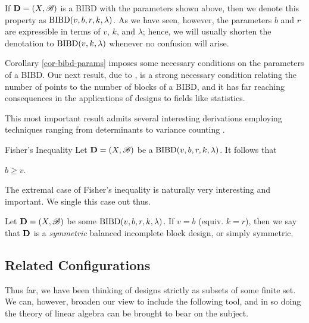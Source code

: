 \documentclass[../../../main]{subfiles}
\begin{document}
 If $\mathbf{D}=(X,\mathscr{B})$ is a BIBD with the parameters shown above, then we denote this property as $\text{BIBD}(v,b,r,k,\lambda)$. As we have seen, however, the parameters $b$ and $r$ are expressible in terms of $v$, $k$, and $\lambda$; hence, we will usually shorten the denotation to $\text{BIBD}(v,k,\lambda)$ whenever no confusion will arise.  

 Corollary \ref{cor-bibd-params} imposes some necessary conditions on the parameters of a BIBD. Our next result, due to \cite{fisher-inequality}, is a strong necessary condition relating the number of points to the number of blocks of a BIBD, and it has far reaching consequences in the applications of designs to fields like statistics.

 This most important result admits several interesting derivations employing
 techniques ranging from determinants to variance counting . 

 \begin{namedthm}{Fisher's Inequality}
   Let $\mathbf{D}=(X,\mathscr{B})$ be a $\text{BIBD}(v,b,r,k,\lambda)$. It follows that 
   \begin{defenum}
   \item\label{fisher} $b \geq v$.
   \end{defenum}
 \end{namedthm}

 The extremal case of Fisher's inequality is naturally very interesting and important. We single this case out thus.

 \begin{defin}\label{square-design}
   Let $\mathbf{D}=(X,\mathscr{B})$ be some $\text{BIBD}(v,b,r,k,\lambda)$. If $v = b$ (equiv. $k = r$), then we say that $\mathbf{D}$ is a {\it symmetric} balanced incomplete block design, or simply symmetric.
 \end{defin}

 \dinkus

 \subsection{Related Configurations}
 
Thus far, we have been thinking of designs strictly as subsets of some finite set. We can, however, broaden our view to include the following tool, and in so doing the theory of linear algebra can be brought to bear on the subject.
\end{document}
